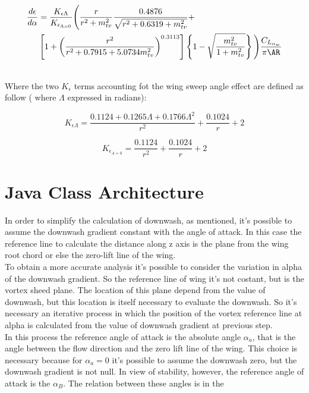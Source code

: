 

\begin{equation}
\begin{split}
 \frac{d\epsilon}{d\alpha} &= \frac{K_{\epsilon \Lambda}}{K_{\epsilon _{\Lambda=0}}}  \Biggr ( \frac{r}{r^2+m_{tv}^2} 
 \frac{0.4876}{\sqrt{r^2 + 0.6319 + m_{tv}^2}}  +\\
& \left [1+{ \left( \frac{r^2}{r^2 + 0.7915 + 5.0734 m_{tv}^2} \right) }^{0.3113}  \right ]    \left \{ 1- \sqrt{\frac{m_{tv}^2}{1+m_{tv}^2}} \right \}      \Biggl )    \frac{C_{L_{{\alpha}_w}}}{\pi \AR}
\end{split}
\end{equation}

\noindent \\
Where the two $K_{\epsilon}$ terms accounting fot the wing sweep angle effect are defined as follow ( where $\Lambda $ expressed in radians):

\begin{equation}
K_{\epsilon \Lambda} = \frac{ 0.1124 + 0.1265 \Lambda + 0.1766 \Lambda^2}{r^2} + \frac{0.1024}{r} +2
\end{equation}

\begin{equation}
K_{\epsilon _{\Lambda=0}} = \frac{ 0.1124 }{r^2} + \frac{0.1024}{r} +2
\end{equation}

\section{Java Class Architecture}

In order to simplify the calculation of downwash, as mentioned, it's possible to assume the downwash gradient constant with the angle of attack. In this case the reference line to calculate the distance along z axis is the plane from the wing root chord or else the zero-lift line of the wing.\\
To obtain a more accurate analysis it's possible to consider the variation in alpha of the downwash gradient. So the reference line of wing it's not costant, but is the vortex sheed plane. The location of this plane depend from the value of downwash, but this location is itself necessary to evaluate the downwash. So it's necessary an iterative process in which the position of the vortex reference line at alpha is calculated from the value of downwash gradient at previous step.\\ 

In this process the reference angle of attack is the absolute angle $\alpha_a$, that is the angle between the flow direction and the zero lift line of the wing. This choice is necessary because for $\alpha_a = 0$ it's possible to assume the downwash zero, but the downwash gradient is not null.
In view of stability, however, the reference angle of attack is the $\alpha_B$. The relation between these angles is in the %

